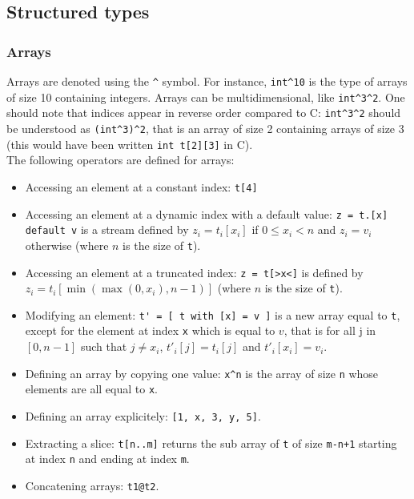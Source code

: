 \documentclass[a4paper]{article}
\begin{document}
\subsection{Structured types}

\subsubsection{Arrays}

Arrays are denoted using the \lstinline+^+ symbol. For instance, \lstinline+int^10+ is the type of arrays of size 10 containing integers. Arrays can be multidimensional, like \lstinline{int^3^2}. One should note that indices appear in reverse order compared to C: \lstinline{int^3^2} should be understood as \lstinline{(int^3)^2}, that is an array of size 2 containing arrays of size 3 (this would have been written \lstinline{int t[2][3]} in C). \\

The following operators are defined for arrays:
\begin{itemize}
\item Accessing an element at a constant index: \lstinline{t[4]}
\item Accessing an element at a dynamic index with a default value: \lstinline{z = t.[x] default v} is a stream defined by $z_i = t_i[x_i]$ if $0 \leq x_i < n$ and $z_i = v_i$ otherwise (where $n$ is the size of \lstinline+t+).
\item Accessing an element at a truncated index: \lstinline+z = t[>x<]+ is defined by $z_i = t_i[\min(\max(0, x_i), n-1)]$ (where $n$ is the size of \lstinline+t+).
\item Modifying an element: \lstinline{t' = [ t with [x] = v ]} is a new array equal to \lstinline+t+, except for the element at index \lstinline+x+ which is equal to $v$, that is for all j in $[0, n-1]$ such that $j \neq x_i$, $t'_i[j] = t_i[j]$ and $t'_i[x_i] = v_i$.
\item Defining an array by copying one value: \lstinline+x^n+ is the array of size \lstinline+n+ whose elements are all equal to \lstinline+x+.
\item Defining an array explicitely:  \lstinline+[1, x, 3, y, 5]+.
\item Extracting a slice: \lstinline+t[n..m]+ returns the sub array of \lstinline+t+ of size \lstinline{m-n+1} starting at index \lstinline+n+ and ending at index \lstinline+m+.
\item Concatening arrays: \lstinline+t1@t2+.
\end{itemize}
\end{document}
